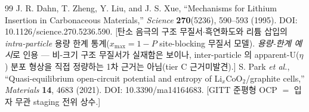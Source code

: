 \documentclass[11pt,a4paper]{article}
\begin{document}
\begin{thebibliography}{99}
 J. R. Dahn, T. Zheng, Y. Liu, and J. S. Xue, ``Mechanisms for Lithium Insertion in Carbonaceous Materials,'' \emph{Science} \textbf{270}(5236), 590--593 (1995). DOI: 10.1126/science.270.5236.590. [탄소 음극의 구조 무질서$\cdot$흑연화도와 리튬 삽입의 \emph{intra-particle} 용량 한계 통계($x_{\max}=1-P$ site-blocking 무질서 모델). \emph{용량-한계 예시}로 인용 — 비-크기 구조 무질서가 실재함은 보이나, inter-particle 의 apparent-U($\eta$) 분포 형상을 직접 정량하는 1차 근거는 아님(tier C 근거미발견).]
 S. Park \emph{et al.}, ``Quasi-equilibrium open-circuit potential and entropy of Li$_x$CoO$_2$/graphite cells,'' \emph{Materials} \textbf{14}, 4683 (2021). DOI: 10.3390/ma14164683. [GITT 준평형 OCP $=$ 입자 무관 staging 전위 상수.]
\end{thebibliography}
\end{document}

